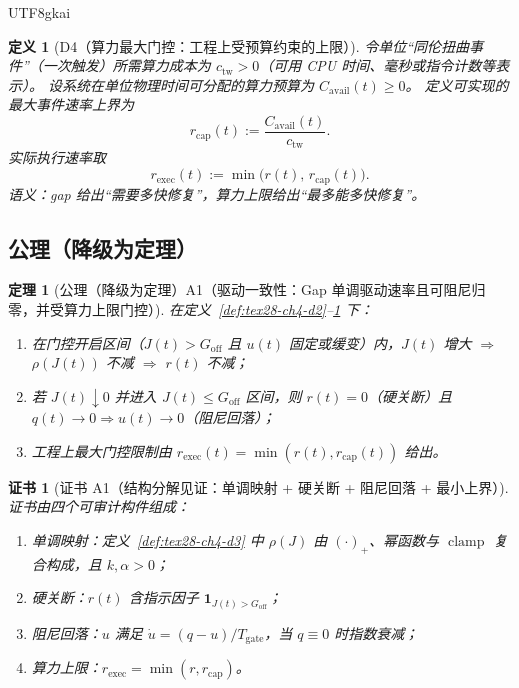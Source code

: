 \documentclass[12pt]{article}
\newtheorem{definition}{定义}[section]
\newtheorem{theorem}{定理}[section]
\newtheorem{Certificate}{证书}[section]
\newcommand{\indicator}[1]{\mathbf{1}_{#1}}
\newcommand{\clamp}{\operatorname{clamp}}
\begin{document}
\begin{CJK*}{UTF8}{gkai}
\begin{definition}[D4（算力最大门控：工程上受预算约束的上限）]
\label{def:tex28-ch4-d4}
令单位“同伦扭曲事件”（一次触发）所需算力成本为 $c_{\mathrm{tw}}>0$（可用 CPU 时间、毫秒或指令计数等表示）。
设系统在单位物理时间可分配的算力预算为 $C_{\mathrm{avail}}(t)\ge 0$。
定义可实现的最大事件速率上界为
\[
  r_{\mathrm{cap}}(t):=\frac{C_{\mathrm{avail}}(t)}{c_{\mathrm{tw}}}.
\]
实际执行速率取
\[
  r_{\mathrm{exec}}(t):=\min\bigl(r(t),\,r_{\mathrm{cap}}(t)\bigr).
\]
语义：gap 给出“需要多快修复”，算力上限给出“最多能多快修复”。
\end{definition}

\subsection{公理（降级为定理）}
\label{subsec:tex28-ch4-axioms}

\begin{theorem}[公理（降级为定理）A1（驱动一致性：Gap 单调驱动速率且可阻尼归零，并受算力上限门控）]
\label{thm:tex28-ch4-a1}
在定义~\ref{def:tex28-ch4-d2}--\ref{def:tex28-ch4-d4} 下：
\begin{enumerate}
  \item 在门控开启区间（$J(t)>G_{\mathrm{off}}$ 且 $u(t)$ 固定或缓变）内，$J(t)$ 增大 $\Rightarrow$ $\rho(J(t))$ 不减 $\Rightarrow$ $r(t)$ 不减；

  \item 若 $J(t)\downarrow 0$ 并进入 $J(t)\le G_{\mathrm{off}}$ 区间，则 $r(t)=0$（硬关断）且 $q(t)\to 0\Rightarrow u(t)\to 0$（阻尼回落）；
  \item 工程上最大门控限制由 $r_{\mathrm{exec}}(t)=\min(r(t),r_{\mathrm{cap}}(t))$ 给出。
\end{enumerate}
\end{theorem}

\begin{Certificate}[证书 A1（结构分解见证：单调映射 + 硬关断 + 阻尼回落 + 最小上界）]
\label{cert:tex28-ch4-a1}
证书由四个可审计构件组成：
\begin{enumerate}
  \item 单调映射：定义~\ref{def:tex28-ch4-d3} 中 $\rho(J)$ 由 $(\cdot)_{+}$、幂函数与 $\clamp$ 复合构成，且 $k,\alpha>0$；
  \item 硬关断：$r(t)$ 含指示因子 $\indicator{J(t)>G_{\mathrm{off}}}$；
  \item 阻尼回落：$u$ 满足 $\dot u=(q-u)/T_{\mathrm{gate}}$，当 $q\equiv 0$ 时指数衰减；
  \item 算力上限：$r_{\mathrm{exec}}=\min(r,r_{\mathrm{cap}})$。
\end{enumerate}
\end{Certificate}


\end{CJK*}
\end{document}
